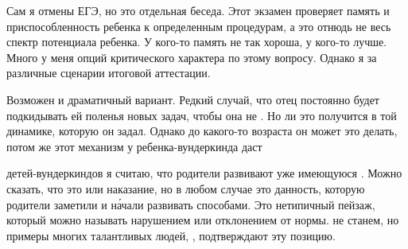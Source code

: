Сам я  отмены ЕГЭ, но это отдельная беседа. Этот экзамен проверяет память и приспособленность ребенка к определенным процедурам, а это отнюдь не весь спектр потенциала ребенка. У кого-то память не так хороша, у кого-то лучше. Много у меня опций критического характера по этому вопросу. Однако я за различные сценарии итоговой аттестации.

\begin{fancyquotes}
    Возможен и драматичный вариант. Редкий случай, что отец постоянно будет подкидывать ей поленья новых задач, чтобы она не . Но  ли это получится в той динамике, которую он задал. Однако до какого-то возраста он может это делать, потом же этот механизм у ребенка-вундеркинда даст 
\end{fancyquotes}

 детей-вундеркиндов я считаю, что родители развивают уже имеющуюся . Можно сказать, что это  или наказание, но в любом случае это данность, которую родители заметили и н\'{а}чали развивать  способами. Это нетипичный пейзаж, который можно называть  нарушением или отклонением от нормы.  не станем, но примеры многих талантливых людей, , подтверждают эту позицию.

